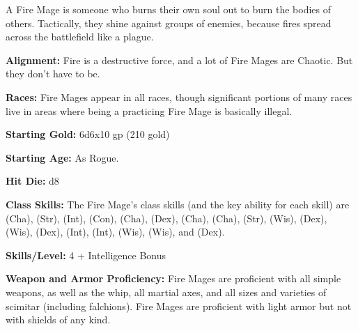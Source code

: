 
A Fire Mage is someone who burns their own soul out to burn the bodies of others. Tactically, they shine against groups of enemies, because fires spread across the battlefield like a plague.

\textbf{Alignment:} Fire is a destructive force, and a lot of Fire Mages are Chaotic. But they don't have to be.

\textbf{Races:} Fire Mages appear in all races, though significant portions of many races live in areas where being a practicing Fire Mage is basically illegal. 

\textbf{Starting Gold:} 6d6x10 gp (210 gold)

\textbf{Starting Age:} As Rogue.

\textbf{Hit Die:} d8

\textbf{Class Skills:} The Fire Mage's class skills (and the key ability for each skill) are  (Cha),  (Str),  (Int),  (Con),  (Cha),  (Dex),  (Cha),  (Cha),  (Str),  (Wis),  (Dex),  (Wis),  (Dex),  (Int),  (Int),  (Wis),  (Wis), and  (Dex).

\textbf{Skills/Level:} 4 + Intelligence Bonus

\modebab{}
\goodfor{}
\goodref{}
\goodwil{}

\begin{classtable}
\end{classtable}

\classfeatures

\textbf{Weapon and Armor Proficiency:} Fire Mages are proficient with all simple weapons, as well as the whip, all martial axes, and all sizes and varieties of scimitar (including falchions). Fire Mages are proficient with light armor but not with shields of any kind.

